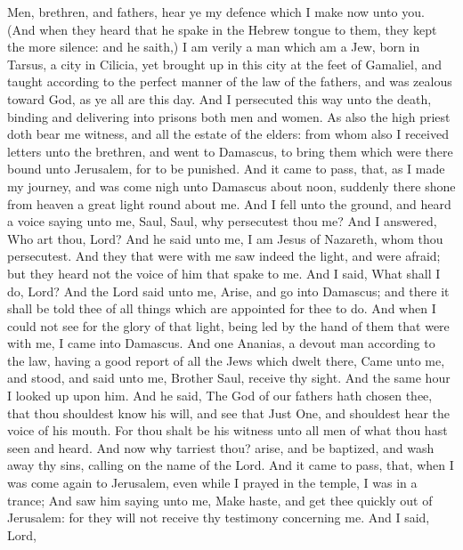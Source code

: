  Men, brethren, and fathers, hear ye my defence which I
make now unto you.  (And when they heard that he spake in
the Hebrew tongue to them, they kept the more silence: and he saith,)
 I am verily a man which am a Jew, born in Tarsus, a city
in Cilicia, yet brought up in this city at the feet of Gamaliel, and
taught according to the perfect manner of the law of the fathers, and
was zealous toward God, as ye all are this day.  And I
persecuted this way unto the death, binding and delivering into prisons
both men and women.  As also the high priest doth bear me
witness, and all the estate of the elders: from whom also I received
letters unto the brethren, and went to Damascus, to bring them which
were there bound unto Jerusalem, for to be punished.  And
it came to pass, that, as I made my journey, and was come nigh unto
Damascus about noon, suddenly there shone from heaven a great light
round about me.  And I fell unto the ground, and heard a
voice saying unto me, Saul, Saul, why persecutest thou me?
 And I answered, Who art thou, Lord? And he said unto me,
I am Jesus of Nazareth, whom thou persecutest.  And they
that were with me saw indeed the light, and were afraid; but they heard
not the voice of him that spake to me.  And I said, What
shall I do, Lord? And the Lord said unto me, Arise, and go into
Damascus; and there it shall be told thee of all things which are
appointed for thee to do.  And when I could not see for
the glory of that light, being led by the hand of them that were with
me, I came into Damascus.  And one Ananias, a devout man
according to the law, having a good report of all the Jews which dwelt
there,  Came unto me, and stood, and said unto me,
Brother Saul, receive thy sight. And the same hour I looked up upon him.
 And he said, The God of our fathers hath chosen thee,
that thou shouldest know his will, and see that Just One, and shouldest
hear the voice of his mouth.  For thou shalt be his
witness unto all men of what thou hast seen and heard. 
And now why tarriest thou? arise, and be baptized, and wash away thy
sins, calling on the name of the Lord.  And it came to
pass, that, when I was come again to Jerusalem, even while I prayed in
the temple, I was in a trance;  And saw him saying unto
me, Make haste, and get thee quickly out of Jerusalem: for they will not
receive thy testimony concerning me.  And I said, Lord,

